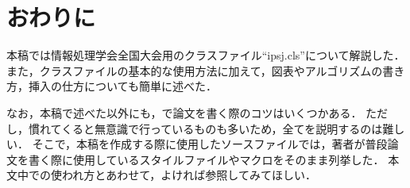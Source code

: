 \documentclass[lualatex]{ipsj}
\begin{document}
  
\section{おわりに}
本稿では情報処理学会全国大会用のクラスファイル``ipsj.cls''について解説した．
また，クラスファイルの基本的な使用方法に加えて，図表やアルゴリズムの書き方，挿入の仕方についても簡単に述べた．

なお，本稿で述べた以外にも，{\LaTeXe}で論文を書く際のコツはいくつかある．
ただし，慣れてくると無意識で行っているものも多いため，全てを説明するのは難しい．
そこで，本稿を作成する際に使用したソースファイルでは，著者が普段論文を書く際に使用しているスタイルファイルやマクロをそのまま列挙した．
本文中での使われ方とあわせて，よければ参照してみてほしい．

\small


\end{document}
